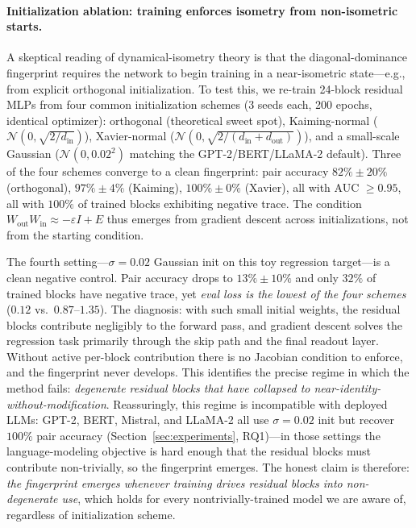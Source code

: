 \documentclass[wcp]{jmlr}
\begin{document}
\paragraph{Initialization ablation: training enforces isometry from non-isometric starts.}
A skeptical reading of dynamical-isometry theory is that the diagonal-dominance fingerprint requires the network to begin training in a near-isometric state---e.g., from explicit orthogonal initialization. To test this, we re-train 24-block residual MLPs from four common initialization schemes (3 seeds each, 200 epochs, identical optimizer): orthogonal (theoretical sweet spot), Kaiming-normal ($\mathcal{N}(0, \sqrt{2/d_{\mathrm{in}}})$), Xavier-normal ($\mathcal{N}(0, \sqrt{2/(d_{\mathrm{in}}{+}d_{\mathrm{out}})})$), and a small-scale Gaussian ($\mathcal{N}(0, 0.02^2)$ matching the GPT-2/BERT/LLaMA-2 default). Three of the four schemes converge to a clean fingerprint: pair accuracy $82\%\pm 20\%$ (orthogonal), $97\%\pm 4\%$ (Kaiming), $100\%\pm 0\%$ (Xavier), all with AUC $\geq 0.95$, all with $100\%$ of trained blocks exhibiting negative trace. The condition $W_{\mathrm{out}}W_{\mathrm{in}}\approx -\varepsilon I + E$ thus emerges from gradient descent across initializations, not from the starting condition.

The fourth setting---$\sigma{=}0.02$ Gaussian init on this toy regression target---is a clean negative control. Pair accuracy drops to $13\%\pm 10\%$ and only $32\%$ of trained blocks have negative trace, yet \emph{eval loss is the lowest of the four schemes} ($0.12$ vs.\ $0.87$--$1.35$). The diagnosis: with such small initial weights, the residual blocks contribute negligibly to the forward pass, and gradient descent solves the regression task primarily through the skip path and the final readout layer. Without active per-block contribution there is no Jacobian condition to enforce, and the fingerprint never develops. This identifies the precise regime in which the method fails: \emph{degenerate residual blocks that have collapsed to near-identity-without-modification}. Reassuringly, this regime is incompatible with deployed LLMs: GPT-2, BERT, Mistral, and LLaMA-2 all use $\sigma{=}0.02$ init but recover $100\%$ pair accuracy (Section~\ref{sec:experiments}, RQ1)---in those settings the language-modeling objective is hard enough that the residual blocks must contribute non-trivially, so the fingerprint emerges. The honest claim is therefore: \emph{the fingerprint emerges whenever training drives residual blocks into non-degenerate use}, which holds for every nontrivially-trained model we are aware of, regardless of initialization scheme.
\end{document}

